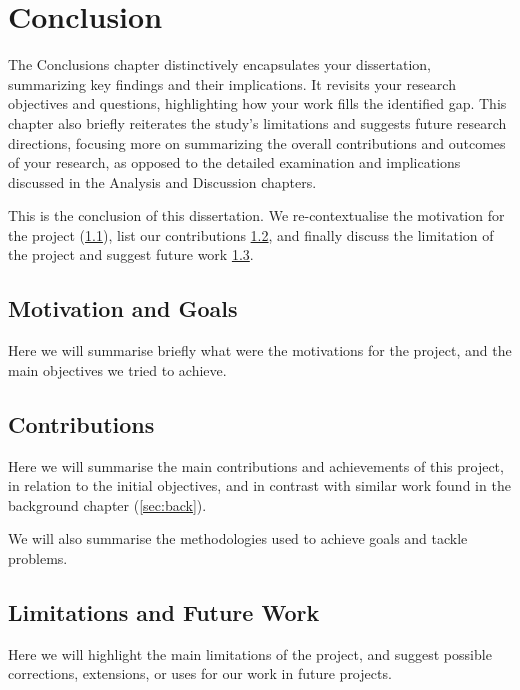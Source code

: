 \section{Conclusion}
\label{sec:concl}

The Conclusions chapter distinctively encapsulates your dissertation, summarizing key findings and their implications. It revisits your research objectives and questions, highlighting how your work fills the identified gap. This chapter also briefly reiterates the study's limitations and suggests future research directions, focusing more on summarizing the overall contributions and outcomes of your research, as opposed to the detailed examination and implications discussed in the Analysis and Discussion chapters.

This is the conclusion of this dissertation. We re-contextualise the motivation for the project (\cref{sec:concl_motiv}), list our contributions \cref{sec:concl_contrib}, and finally discuss the limitation of the project and suggest future work \cref{sec:concl_limit}.

\subsection{Motivation and Goals}
\label{sec:concl_motiv}

Here we will summarise briefly what were the motivations for the project, and the main objectives we tried to achieve.

\subsection{Contributions}
\label{sec:concl_contrib}

Here we will summarise the main contributions and achievements of this project, in relation to the initial objectives, and in contrast with similar work found in the background chapter (\cref{sec:back}).

We will also summarise the methodologies used to achieve goals and tackle problems.

\subsection{Limitations and Future Work}
\label{sec:concl_limit}

Here we will highlight the main limitations of the project, and suggest possible corrections, extensions, or uses for our work in future projects.